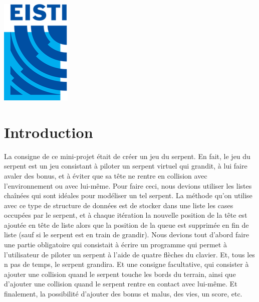 \documentclass[12pt]{article}
\begin{document}
\begin{titlepage}
\includegraphics{Logo_EISTI.png}\\[1cm] %
 

\vfill %

\end{titlepage}

\tableofcontents
\newpage

\section{Introduction}
La consigne de ce mini-projet était de créer un jeu du serpent. En fait, le jeu du serpent est un jeu consistant à piloter un serpent virtuel qui grandit, à lui faire avaler des bonus, et à éviter que sa tête ne rentre en collision avec l'environnement ou avec lui-même. Pour faire ceci, nous devions utiliser les listes chaînées qui sont idéales pour modéliser un tel serpent. La méthode qu'on utilise avec ce type de structure de données est de stocker dans une liste les cases occupées par le serpent, et à chaque itération la nouvelle position de la tête est ajoutée en tête de liste alors que la position de la queue est supprimée en fin de liste (sauf si le serpent est en train de grandir). Nous devions tout d'abord faire une partie obligatoire qui consistait à écrire un programme qui permet à l'utilisateur de piloter un serpent à l'aide de quatre flèches du clavier. Et, tous les n pas de temps, le serpent grandira. Et une consigne facultative, qui consister à ajouter une collision quand le serpent touche les bords du terrain, ainsi que d'ajouter une collision quand le serpent rentre en contact avec lui-même. Et finalement, la possibilité d'ajouter des bonus et malus, des vies, un score, etc.
\end{document}
